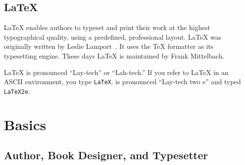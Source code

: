 \subsection{\LaTeX}
 
\LaTeX{} enables authors to typeset and print their work at the highest
typographical quality, using a predefined, professional layout. \LaTeX{} was
originally written by Leslie Lamport~\cite{manual}.
It uses the \TeX{} formatter as its typesetting engine. These days \LaTeX{}
is maintained by Frank Mittelbach.


\LaTeX{} is pronounced ``Lay-tech'' or ``Lah-tech.'' If you refer to
\LaTeX{} in an ASCII environment, you type \texttt{LaTeX}.
\LaTeXe{} is pronounced ``Lay-tech two e'' and typed \texttt{LaTeX2e}.


%

\section{Basics}
 
\subsection{Author, Book Designer, and Typesetter}

